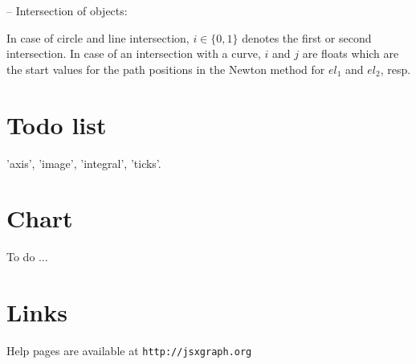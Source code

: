{-- Intersection of objects:}\par
{}
\par
In case of circle and line intersection, $i\in\{0,1\}$ denotes 
the first or second intersection. In case of an intersection with a curve, $i$ and $j$ are floats
which are the start values for the path positions in the Newton method for $el_1$ and $el_2$, resp.

\section{Todo list}
'axis', 'image', 'integral', 'ticks'.

\section{Chart}
To do $\ldots$


\section{Links}
Help pages are available at
{\tt http://jsxgraph.org}



\copyrightnotice
%

\bye

